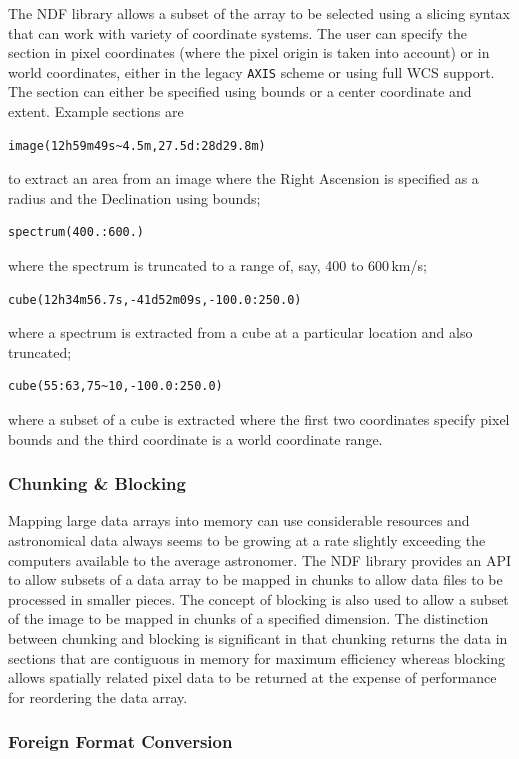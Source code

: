 \documentclass[final,authoryear,5p,times,twocolumn]{elsarticle}
\begin{document}
The NDF library allows a subset of the array to be selected using a
slicing syntax that can work with variety of coordinate systems. The
user can specify the section in pixel coordinates (where the pixel
origin is taken into account) or in world coordinates, either in the
legacy \texttt{AXIS} scheme or using full WCS support. The section can
either be specified using bounds or a center coordinate and
extent. Example sections are
\begin{verbatim}
image(12h59m49s~4.5m,27.5d:28d29.8m)
\end{verbatim}
to extract an area from an image where the Right Ascension is
specified as a radius and the Declination using bounds;
\begin{verbatim}
spectrum(400.:600.)
\end{verbatim}
where the spectrum is truncated to a range of, say, 400 to 600\,km/s;
\begin{verbatim}
cube(12h34m56.7s,-41d52m09s,-100.0:250.0)
\end{verbatim}
where a spectrum is extracted from a cube at a particular location and
also truncated;
\begin{verbatim}
cube(55:63,75~10,-100.0:250.0)
\end{verbatim}
where a subset of a cube is extracted where the first two coordinates
specify pixel bounds and the third coordinate is a world coordinate range.

\subsubsection{Chunking \& Blocking}

Mapping large data arrays into memory can use considerable resources
and astronomical data always seems to be growing at a rate slightly
exceeding the computers available to the average astronomer. The NDF
library provides an API to allow subsets of a data array to be mapped
in chunks to allow data files to be processed in smaller pieces. The
concept of blocking is also used to allow a subset of the image to be
mapped in chunks of a specified dimension. The distinction between
chunking and blocking is significant in that chunking returns the data
in sections that are contiguous in memory for maximum efficiency
whereas blocking allows spatially related pixel data to be returned at
the expense of performance for reordering the data array.

\subsubsection{Foreign Format Conversion}
\end{document}
